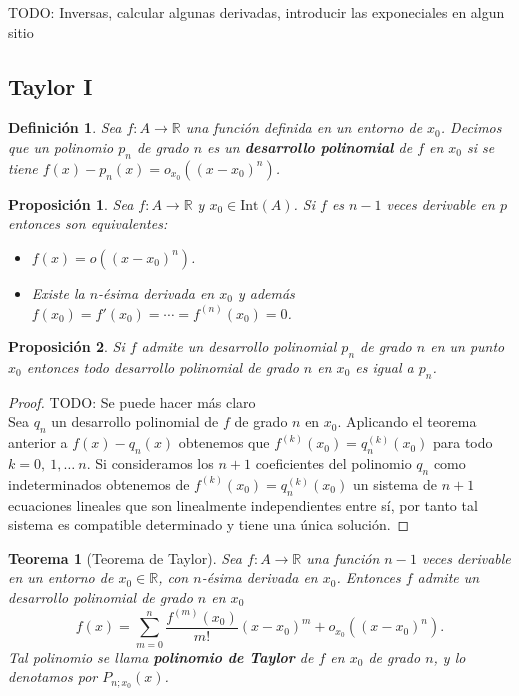 \documentclass{article}
\newtheorem{theorem}{Teorema}
\newtheorem{prop}{Proposición}
\newtheorem{define}{Definición}
\newcommand{\reales}{\mathbb{R}}
\newcommand{\interior}[1]{\text{Int}(#1)}
\begin{document}
TODO: Inversas, calcular algunas derivadas, introducir las exponeciales en algun sitio

\subsection{Taylor I}

\begin{define}
	Sea $f: A \rightarrow \reales$ una función definida en un entorno de $x_0$. Decimos que un polinomio $p_n$ de grado $n$ es un \textbf{desarrollo polinomial} de $f$ en $x_0$ si se tiene $f(x) - p_n(x) = o_{x_0}((x-x_0)^n)$.
\end{define}

\begin{prop}
	Sea $f: A \rightarrow \reales$ y $x_0 \in \interior{A}$. Si $f$ es $n-1$ veces derivable en $p$ entonces son equivalentes:
	\begin{itemize}
		\item
		$f(x) = o((x-x_0)^n)$.
		\item
		Existe la $n$-ésima derivada en $x_0$ y además $f(x_0) = f'(x_0) = \cdots = f^{(n)}(x_0) = 0$.
	\end{itemize}
\end{prop}

\begin{prop}
	Si $f$ admite un desarrollo polinomial $p_n$ de grado $n$ en un punto $x_0$ entonces todo desarrollo polinomial de grado $n$ en $x_0$ es igual a $p_n$.
\end{prop}

\begin{proof} TODO: Se puede hacer más claro\\ 
	Sea $q_n$ un desarrollo polinomial de $f$ de grado $n$ en $x_0$. Aplicando el teorema anterior a $f(x) - q_n(x)$ obtenemos que $f^{(k)}(x_0) = q_n^{(k)}(x_0)$ para todo $k=0,\ 1,\dots\ n$. Si consideramos los $n+1$ coeficientes del polinomio $q_n$ como indeterminados obtenemos de $f^{(k)}(x_0) = q_n^{(k)}(x_0)$ un sistema de $n+1$ ecuaciones lineales que son linealmente independientes entre sí, por tanto tal sistema es compatible determinado y tiene una única solución.
\end{proof}

\begin{theorem}[Teorema de Taylor]
	Sea $f: A \rightarrow \reales$ una función $n-1$ veces derivable en un entorno de $x_0 \in \reales$, con $n$-ésima derivada en $x_0$. Entonces $f$ admite un desarrollo polinomial de grado $n$ en $x_0$
	\begin{equation*}
		f(x) = \sum_{m=0}^{n} \frac{f^{(m)}(x_0)}{m!} (x-x_0)^m + o_{x_0}((x-x_0)^n).
	\end{equation*}
	Tal polinomio se llama \textbf{polinomio de Taylor} de $f$ en $x_0$ de grado $n$, y lo denotamos por $P_{n;x_0}(x)$.
\end{theorem}
\end{document}
